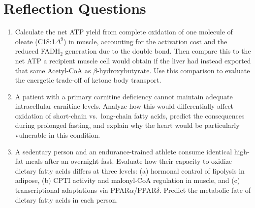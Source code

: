 \documentclass{tufte-handout}
\begin{document}
\section{Reflection Questions}
\begin{enumerate}
\item Calculate the net ATP yield from complete oxidation of one molecule of oleate (C18:1$\Delta^9$) in muscle, accounting for the activation cost and the reduced FADH$_2$ generation due to the double bond. Then compare this to the net ATP a recipient muscle cell would obtain if the liver had instead exported that same Acetyl-CoA as $\beta$-hydroxybutyrate. Use this comparison to evaluate the energetic trade-off of ketone body transport.
\item A patient with a primary carnitine deficiency cannot maintain adequate intracellular carnitine levels. Analyze how this would differentially affect oxidation of short-chain vs.\ long-chain fatty acids, predict the consequences during prolonged fasting, and explain why the heart would be particularly vulnerable in this condition.
\item A sedentary person and an endurance-trained athlete consume identical high-fat meals after an overnight fast. Evaluate how their capacity to oxidize dietary fatty acids differs at three levels: (a) hormonal control of lipolysis in adipose, (b) CPTI activity and malonyl-CoA regulation in muscle, and (c) transcriptional adaptations via PPAR$\alpha$/PPAR$\delta$. Predict the metabolic fate of dietary fatty acids in each person.
\end{enumerate}



\end{document}
